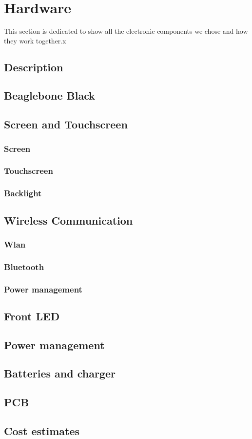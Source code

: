 \section{Hardware}
This section is dedicated to show all the electronic components we chose and how they work together.x
\subsection{Description}
\subsection{Beaglebone Black}
\subsection{Screen and Touchscreen}
\subsubsection{Screen}
\subsubsection{Touchscreen}
\subsubsection{Backlight}
\subsection{Wireless Communication}
\subsubsection{Wlan}
\subsubsection{Bluetooth}
\subsubsection{Power management}
\subsection{Front LED}
\subsection{Power management}
\subsection{Batteries and charger}
\subsection{PCB}
\subsection{Cost estimates}
